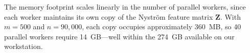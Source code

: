 The memory footprint scales linearly in the number of parallel workers, since each worker maintains its own copy of the Nystr\"{o}m feature matrix $\mathbf{Z}$.
With $m = 500$ and $n = 90{,}000$, each copy occupies approximately 360~MB, so 40 parallel workers require 14~GB---well within the 274~GB available on our workstation.
